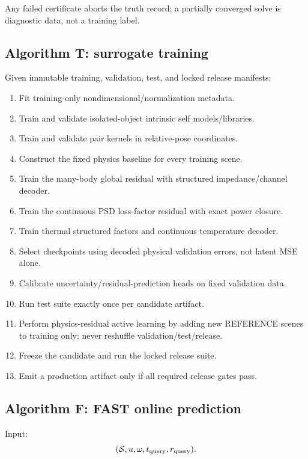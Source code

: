 Any failed certificate aborts the truth record; a partially converged solve is
diagnostic data, not a training label.

\subsection{Algorithm T: surrogate training}

Given immutable training, validation, test, and locked release manifests:

\begin{enumerate}
\item Fit training-only nondimensional/normalization metadata.
\item Train and validate isolated-object intrinsic self models/libraries.
\item Train and validate pair kernels in relative-pose coordinates.
\item Construct the fixed physics baseline for every training scene.
\item Train the many-body global residual with structured impedance/channel
      decoder.
\item Train the continuous PSD loss-factor residual with exact power closure.
\item Train thermal structured factors and continuous temperature decoder.
\item Select checkpoints using decoded physical validation errors, not latent
      MSE alone.
\item Calibrate uncertainty/residual-prediction heads on fixed validation data.
\item Run test suite exactly once per candidate artifact.
\item Perform physics-residual active learning by adding new REFERENCE scenes to
      training only; never reshuffle validation/test/release.
\item Freeze the candidate and run the locked release suite.
\item Emit a production artifact only if all required release gates pass.
\end{enumerate}

\subsection{Algorithm F: FAST online prediction}

Input:
\[
  (\mathcal S,u,\omega,t_{\rm query},r_{\rm query}).
\]

